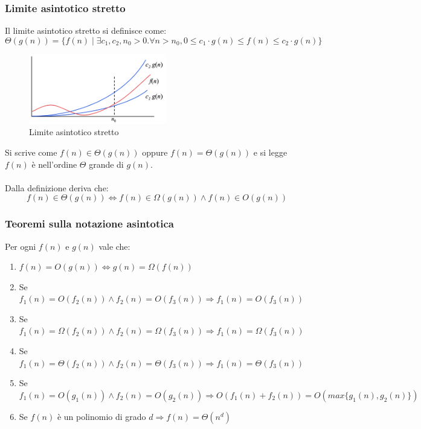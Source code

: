\subsubsection{Limite asintotico stretto}
\begin{definition}
	Il limite asintotico stretto si definisce come:
	\begin{equation}
		\Theta(g(n)) = \{f(n) \mid \exists c_1, c_2, n_0 > 0 . \forall n > n_0, 0 \leq c_1 \cdot g(n) \leq f(n) \leq c_2 \cdot g(n) \}
	\end{equation}
\end{definition}
\begin{figure}
	\vspace{-10pt}
	\centering
	\includegraphics[width=6cm]{images/limite-asintotico-stretto.png}
	\vspace{-5pt}
	\caption{Limite asintotico stretto}
\end{figure}
Si scrive come $f(n) \in \Theta(g(n))$ oppure $f(n) = \Theta(g(n))$ e si legge $f(n)$ è nell'ordine $\Theta$ grande di $g(n)$.\\\\

\vspace{55pt}
Dalla definizione deriva che:
\begin{equation}
	f(n) \in \Theta(g(n)) \Longleftrightarrow f(n) \in \Omega(g(n)) \land f(n) \in O(g(n))
\end{equation}

\subsubsection{Teoremi sulla notazione asintotica}
\begin{theorem}
	Per ogni $f(n)$ e $g(n)$ vale che:
	\begin{enumerate}
		\item $f(n) = O(g(n)) \Longleftrightarrow g(n) = \Omega(f(n))$
		\item Se $f_1(n) = O(f_2(n)) \land f_2(n) = O(f_3(n)) \Longrightarrow f_1(n) = O(f_3(n))$
		\item Se $f_1(n) = \Omega(f_2(n)) \land f_2(n) = \Omega(f_3(n)) \Longrightarrow f_1(n) = \Omega(f_3(n))$
		\item Se $f_1(n) = \Theta(f_2(n)) \land f_2(n) = \Theta(f_3(n)) \Longrightarrow f_1(n) = \Theta(f_3(n))$
		\item Se $f_1(n) = O(g_1(n)) \land f_2(n) = O(g_2(n)) \Longrightarrow O(f_1(n) + f_2(n)) = O(max\{g_1(n),g_2(n)\})$
		\item Se $f(n)$ è un polinomio di grado $d \Longrightarrow f(n) = \Theta(n^d)$
	\end{enumerate}
\end{theorem}

